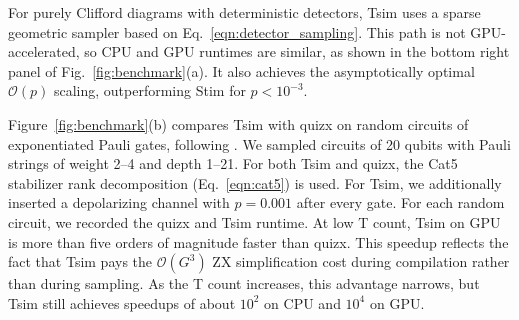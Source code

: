 \documentclass[
  a4paper,
  onecolumn,
  11pt,
  allowtoday
]{quantumarticle}
\newcommand{\bigO}[1]{\mathcal{O}(#1)}
\newcommand{\ngates}{G}          %
\newcommand{\perr}{p}            %
\begin{document}
For purely Clifford diagrams with deterministic detectors, Tsim uses a sparse geometric sampler based on Eq.~\eqref{eqn:detector_sampling}. This path is not GPU-accelerated, so CPU and GPU runtimes are similar, as shown in the bottom right panel of Fig.~\ref{fig:benchmark}(a). It also achieves the asymptotically optimal
$\bigO{\perr}$ scaling, outperforming Stim for $\perr < 10^{-3}$.

Figure~\ref{fig:benchmark}(b) compares Tsim with quizx on random circuits of
exponentiated Pauli gates, following \cite{kissinger2022classical}. We sampled
circuits of 20 qubits with Pauli strings of weight 2--4 and depth 1--21. For both Tsim and quizx, the Cat5 stabilizer rank decomposition (Eq.~\ref{eqn:cat5}) is used.
For Tsim, we additionally inserted a depolarizing channel with $p=0.001$ after
every gate. For each random circuit, we recorded the quizx and Tsim runtime. At
low T count, Tsim on GPU is more than five orders of magnitude faster than
quizx. This speedup reflects the fact that Tsim pays the $\bigO{\ngates^3}$ ZX
simplification cost during compilation rather than during sampling. As the T
count increases, this advantage narrows, but Tsim still achieves speedups of
about $10^2$ on CPU and $10^4$ on GPU.

\end{document}
